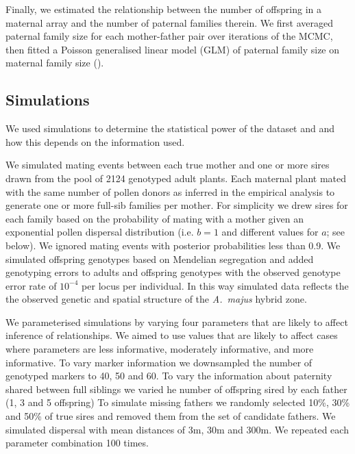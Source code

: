 \documentclass[10pt, a4paper, twocolumn]{article} %
\begin{document}
Finally, we estimated the relationship between the number of offspring in a maternal array and the number of paternal families therein.
We first averaged paternal family size for each mother-father pair over iterations of the MCMC, then fitted a Poisson generalised linear model (GLM) of paternal family size on maternal family size (\cite{McCullagh1989}).

\subsection{Simulations}

We used simulations to determine the statistical power of the dataset and and how this depends on the information used.

We simulated mating events between each true mother and one or more sires drawn from the pool of 2124 genotyped adult plants.
Each maternal plant mated with the same number of pollen donors as inferred in the empirical analysis to generate one or more full-sib families per mother.
For simplicity we drew sires for each family based on the probability of mating with a mother given an exponential pollen dispersal distribution (i.e. $b=1$ and different values for $a$; see below).
We ignored mating events with posterior probabilities less than 0.9.
We simulated offspring genotypes based on Mendelian segregation and added genotyping errors to adults and offspring genotypes with the observed genotype error rate of $10^{-4}$ per locus per individual.
In this way simulated data reflects the the observed genetic and spatial structure of the \textit{A.~majus} hybrid zone.

We parameterised simulations by varying four parameters that are likely to affect inference of relationships.
We aimed to use values that are likely to affect cases where parameters are less informative, moderately informative, and more informative.
To vary marker information we downsampled the number of genotyped markers to 40, 50 and 60.
To vary the information about paternity shared between full siblings we varied he number of offspring sired by each father (1, 3 and 5 offspring)
To simulate missing fathers we randomly selected 10\%, 30\% and 50\% of true sires and removed them from the set of candidate fathers.
We simulated dispersal with mean distances of 3m, 30m and 300m.
We repeated each parameter combination 100 times.
\end{document}
